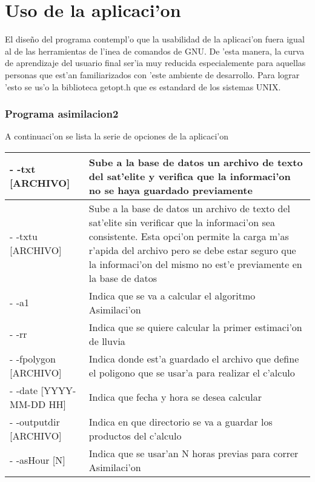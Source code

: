 \section{Uso de la aplicaci'on}

El dise\~no del programa contempl'o que la usabilidad de la aplicaci'on fuera igual al de las herramientas de l'inea de comandos de GNU.
De 'esta manera, la curva de aprendizaje del usuario final ser'ia muy reducida especialemente para aquellas personas que est'an 
familiarizados con 'este ambiente de desarrollo. Para lograr 'esto se us'o la biblioteca getopt.h que es estandard de los sistemas UNIX.


\subsubsection*{Programa asimilacion2}
A continuaci'on se lista la serie de opciones de la aplicaci'on
\begin{center}
  \begin{tabular}{|l|p{12cm}|}
  \hline
  - -txt [ARCHIVO] & Sube a la base de datos un archivo de texto del sat'elite y verifica que la 
		      informaci'on no se haya guardado previamente\\ \hline 
  - -txtu [ARCHIVO] & Sube a la base de datos un archivo de texto del sat'elite sin verificar que 
		      la informaci'on sea consistente. Esta opci'on permite la carga m'as r'apida del archivo pero se debe estar seguro que
		      la informaci'on del mismo no est'e previamente en la base de datos\\ \hline
  - -a1 & Indica que se va a calcular el algoritmo Asimilaci'on \\ \hline
  - -rr & Indica que se quiere calcular la primer estimaci'on de lluvia \\ \hline
  - -fpolygon [ARCHIVO] & Indica donde est'a guardado el archivo que define el poligono que se usar'a para realizar el c'alculo \\ \hline
  - -date [YYYY-MM-DD HH] & Indica que fecha y hora se desea calcular \\ \hline
  - -outputdir [ARCHIVO] & Indica en que directorio se va a guardar los productos del c'alculo \\ \hline
  - -asHour [N] & Indica que se usar'an N horas previas para correr Asimilaci'on \\ \hline 
  \end{tabular} 
\end{center}

